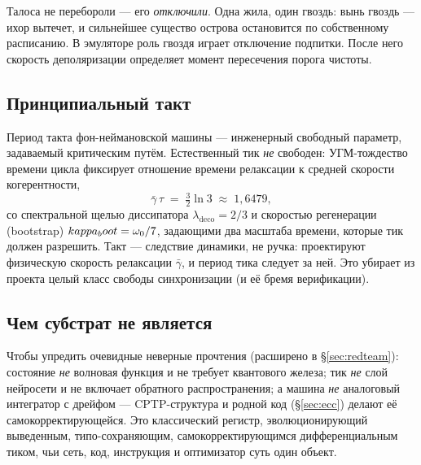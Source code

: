 \begin{mythbox}
Талоса не перебороли --- его \emph{отключили}. Одна жила, один гвоздь:
вынь гвоздь --- ихор вытечет, и сильнейшее существо острова остановится по
собственному расписанию. В эмуляторе роль гвоздя играет отключение подпитки.
После него скорость деполяризации определяет момент пересечения порога чистоты.
\end{mythbox}

\subsection{Принципиальный такт}

Период такта фон-неймановской машины --- инженерный свободный параметр,
задаваемый критическим путём. Естественный тик \TALOS{} \emph{не} свободен:
УГМ-тождество времени цикла фиксирует отношение времени релаксации к средней
скорости когерентности,
\begin{equation}
\bar\gamma\,\tau \;=\; \tfrac{3}{2}\ln 3 \;\approx\; 1{,}6479,
\end{equation}
со спектральной щелью диссипатора $\lambda_{\mathrm{deco}}=2/3$ и скоростью
регенерации (bootstrap) $kappa_boot=\omega_0/7$, задающими два масштаба времени, которые
тик должен разрешить. Такт --- следствие динамики, не ручка: проектируют
физическую скорость релаксации $\bar\gamma$, и период тика следует за ней. Это
убирает из проекта целый класс свободы синхронизации (и её бремя верификации).

\subsection{Чем субстрат не является}

Чтобы упредить очевидные неверные прочтения (расширено в \S\ref{sec:redteam}):
состояние \emph{не} волновая функция и не требует квантового железа; тик \emph{не}
слой нейросети и не включает обратного распространения; а машина \emph{не}
аналоговый интегратор с дрейфом --- CPTP-структура и родной код (\S\ref{sec:ecc})
делают её самокорректирующейся. Это классический регистр, эволюционирующий
выведенным, типо-сохраняющим, самокорректирующимся дифференциальным тиком, чьи
сеть, код, инструкция и оптимизатор суть один объект.
